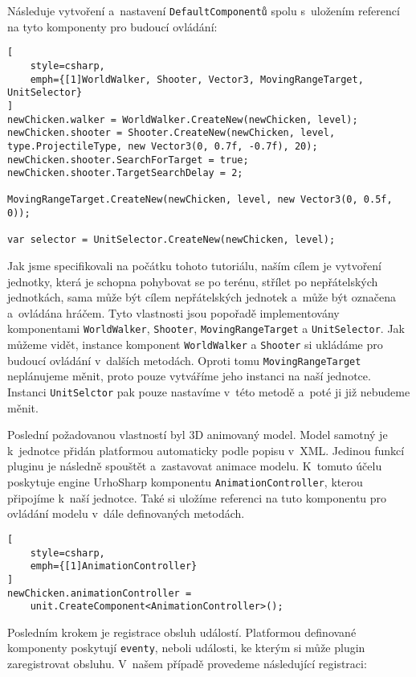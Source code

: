 Následuje vytvoření a~nastavení \texttt{DefaultComponentů} spolu s~uložením referencí na tyto komponenty pro budoucí ovládání:

\begin{lstlisting}[
	style=csharp,
	emph={[1]WorldWalker, Shooter, Vector3, MovingRangeTarget, UnitSelector}
]
newChicken.walker = WorldWalker.CreateNew(newChicken, level);
newChicken.shooter = Shooter.CreateNew(newChicken, level,
type.ProjectileType, new Vector3(0, 0.7f, -0.7f), 20);
newChicken.shooter.SearchForTarget = true;
newChicken.shooter.TargetSearchDelay = 2;

MovingRangeTarget.CreateNew(newChicken, level, new Vector3(0, 0.5f, 0));

var selector = UnitSelector.CreateNew(newChicken, level);
\end{lstlisting}

Jak jsme specifikovali na počátku tohoto tutoriálu, naším cílem je vytvoření jednotky, která je schopna pohybovat se po terénu, střílet po nepřátelských jednotkách, sama může být cílem nepřátelských jednotek a~může být označena a~ovládána hráčem. Tyto vlastnosti jsou popořadě implementovány komponentami \texttt{WorldWalker}, \texttt{Shooter}, \texttt{MovingRangeTarget} a \texttt{UnitSelector}. Jak můžeme vidět, instance komponent \texttt{WorldWalker} a \texttt{Shooter} si ukládáme pro budoucí ovládání v~dalších metodách. Oproti tomu \texttt{MovingRangeTarget} neplánujeme měnit, proto pouze vytváříme jeho instanci na naší jednotce. Instanci \texttt{UnitSelctor} pak pouze nastavíme v~této metodě a~poté ji již nebudeme měnit.


Poslední požadovanou vlastností byl 3D animovaný model. Model samotný je k~jednotce přidán platformou automaticky podle popisu v~XML. Jedinou funkcí pluginu je následně spouštět a~zastavovat animace modelu. K~tomuto účelu poskytuje engine UrhoSharp komponentu \texttt{AnimationController}, kterou připojíme k~naší jednotce. Také si uložíme referenci na tuto komponentu pro ovládání modelu v~dále definovaných metodách.
\begin{lstlisting}[
	style=csharp,
	emph={[1]AnimationController}
]
newChicken.animationController = 		
	unit.CreateComponent<AnimationController>();
\end{lstlisting}

Posledním krokem je registrace obsluh událostí. Platformou definované komponenty poskytují \texttt{eventy}, neboli události, ke kterým si může plugin zaregistrovat obsluhu. V~našem případě provedeme následující registraci:

